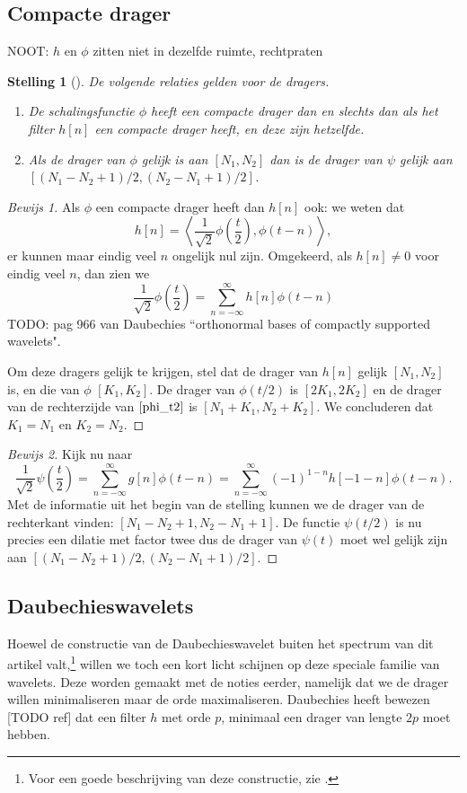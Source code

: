 \documentclass[11pt]{report}
\theoremstyle{plain}
\newtheorem*{stelling}{Stelling}
\theoremstyle{remark}
\begin{document}
\subsection{Compacte drager} 
NOOT: $h$ en $\phi$ zitten niet in dezelfde ruimte, rechtpraten
\begin{stelling}[{\cite[P7.2]{mallat}}]
  De volgende relaties gelden voor de dragers.
  \begin{enumerate}
    \item De schalingsfunctie $\phi$ heeft een compacte drager dan en slechts dan als het filter $h[n]$ een compacte drager heeft, en deze zijn hetzelfde.
    \item Als de drager van $\phi$ gelijk is aan $[N_1,N_2]$ dan is de drager van $\psi$ gelijk aan $[(N_1 - N_2 + 1)/2, (N_2 - N_1 + 1)/2]$.
  \end{enumerate}
\end{stelling}
\begin{proof}[Bewijs 1] Als $\phi$ een compacte drager heeft dan $h[n]$ ook: we weten dat
\[
  h[n] = \left\langle \frac{1}{\sqrt{2}} \phi\left(\frac{t}{2}\right), \phi(t-n) \right\rangle,
\]
er kunnen maar eindig veel $n$ ongelijk nul zijn. Omgekeerd, als $h[n] \not= 0$ voor eindig veel $n$, dan zien we
\begin{equation}
\label{phi_t2}
	\frac{1}{\sqrt{2}} \phi\left(\frac{t}{2}\right) = \sum_{n=-\infty}^\infty h[n] \phi(t-n)
\end{equation}
 TODO: pag 966 van Daubechies ``orthonormal bases of compactly supported wavelets".

Om deze dragers gelijk te krijgen, stel dat de drager van $h[n]$ gelijk $[N_1,N_2]$ is, en die van $\phi$ $[K_1, K_2]$. De drager van $\phi(t/2)$ is $[2K_1, 2K_2]$ en de drager van de rechterzijde van $\ref{phi_t2}$ is $[N_1 + K_1, N_2 + K_2]$. We concluderen dat $K_1 = N_1$ en $K_2 = N_2$.
\end{proof}
\begin{proof}[Bewijs 2]
Kijk nu naar
\[
\frac{1}{\sqrt{2}} \psi\left(\frac{t}{2}\right) = \sum_{n=-\infty}^{\infty} g[n] \phi(t-n) = \sum_{n=-\infty}^{\infty} (-1)^{1-n}h[-1-n] \phi(t-n).
\]
Met de informatie uit het begin van de stelling kunnen we de drager van de rechterkant vinden: $[N_1 - N_2 + 1, N_2 - N_1 + 1]$. De functie $\psi(t/2)$ is nu precies een dilatie met factor twee dus de drager van $\psi(t)$ moet wel gelijk zijn aan $[(N_1 - N_2 + 1)/2, (N_2 - N_1 + 1)/2]$.
\end{proof}

\subsection{Daubechieswavelets}
Hoewel de constructie van de Daubechieswavelet buiten het spectrum van dit artikel valt,\footnote{Voor een goede beschrijving van deze constructie, zie \cite{mallat}.} willen we toch een kort licht schijnen op deze speciale familie van wavelets. Deze worden gemaakt met de noties eerder, namelijk dat we de drager willen minimaliseren maar de orde maximaliseren. Daubechies heeft bewezen [TODO ref] dat een filter $h$ met orde $p$, minimaal een drager van lengte $2p$ moet hebben. 
\end{document}
